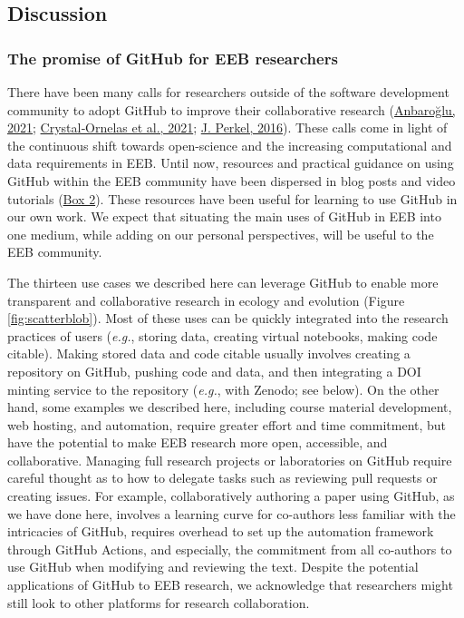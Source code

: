 \hypertarget{discussion}{%
\subsection{Discussion}\label{discussion}}

\hypertarget{the-promise-of-github-for-eeb-researchers}{%
\subsubsection{The promise of GitHub for EEB researchers}\label{the-promise-of-github-for-eeb-researchers}}

There have been many calls for researchers outside of the software development community to adopt GitHub to improve their collaborative research (\protect\hyperlink{ref-UsTxAq4f}{Anbaroğlu, 2021}; \protect\hyperlink{ref-1Du6fzB8g}{Crystal‐Ornelas et al., 2021}; \protect\hyperlink{ref-10ghgV3S8}{J. Perkel, 2016}).
These calls come in light of the continuous shift towards open-science and the increasing computational and data requirements in EEB.
Until now, resources and practical guidance on using GitHub within the EEB community have been dispersed in blog posts and video tutorials (\protect\hyperlink{tips}{Box 2}).
These resources have been useful for learning to use GitHub in our own work.
We expect that situating the main uses of GitHub in EEB into one medium, while adding on our personal perspectives, will be useful to the EEB community.

The thirteen use cases we described here can leverage GitHub to enable more transparent and collaborative research in ecology and evolution (Figure \ref{fig:scatterblob}).
Most of these uses can be quickly integrated into the research practices of users (\emph{e.g.}, storing data, creating virtual notebooks, making code citable).
Making stored data and code citable usually involves creating a repository on GitHub, pushing code and data, and then integrating a DOI minting service to the repository (\emph{e.g.}, with Zenodo; see below).
On the other hand, some examples we described here, including course material development, web hosting, and automation, require greater effort and time commitment, but have the potential to make EEB research more open, accessible, and collaborative.
Managing full research projects or laboratories on GitHub require careful thought as to how to delegate tasks such as reviewing pull requests or creating issues.
For example, collaboratively authoring a paper using GitHub, as we have done here, involves a learning curve for co-authors less familiar with the intricacies of GitHub, requires overhead to set up the automation framework through GitHub Actions, and especially, the commitment from all co-authors to use GitHub when modifying and reviewing the text.
Despite the potential applications of GitHub to EEB research, we acknowledge that researchers might still look to other platforms for research collaboration.

